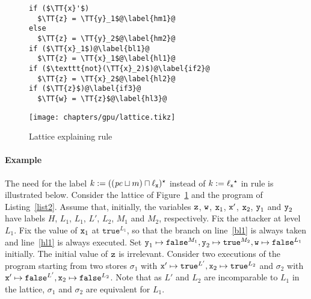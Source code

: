 \begin{figure}[ht]
\begin{minipage}{0.65\linewidth}
\centering
\begin{lstlisting}[caption=Example explaining rule \refrule{bs:cmd:ags},label=list2]
if ($\TT{x}'$)
  $\TT{z} = \TT{y}_1$@\label{hm1}@
else
  $\TT{z} = \TT{y}_2$@\label{hm2}@
if ($\TT{x}_1$)@\label{bl1}@
  $\TT{z} = \TT{x}_1$@\label{hl1}@
if ($\texttt{not}(\TT{x}_2)$)@\label{if2}@
  $\TT{z} = \TT{x}_2$@\label{hl2}@
if ($\TT{z}$)@\label{if3}@
  $\TT{w} = \TT{z}$@\label{hl3}@
\end{lstlisting}
\end{minipage}
\hspace{-1.5cm}
\begin{minipage}{0.45\linewidth}
\centering
{\texttt{[image: chapters/gpu/lattice.tikz]}}
\caption{Lattice explaining rule }
\label{fig:lattice}
\end{minipage}
\end{figure}

\paragraph{Example} 
The need for the label $k := ((\mathit{pc} \sqcup m) \sqcap \ell_{\texttt{x}}){}^\star$
instead of $k := \ell_{\texttt{x}}{}^\star$ in rule  is illustrated
below. Consider the lattice of Figure~\ref{fig:lattice} and the
program of Listing~\ref{list2}. Assume 
that, initially, the variables $\texttt{z}$, $\texttt{w}$, $\texttt{x}_1$,
$\texttt{x}'$, $\texttt{x}_2$, $\texttt{y}_1$ and $\texttt{y}_2$ have labels $H$,
$L_1$, $L_1$, $L'$, $L_2$, $M_1$ and $M_2$, 
respectively. Fix the attacker at level $L_1$. Fix the value of $\texttt{x}_1$
at $\texttt{true}^{L_1}$, so that the branch on line~\ref{bl1} is
always taken and line~\ref{hl1} is always executed. Set $\texttt{y}_1 \mapsto
\texttt{false}^{M_1}, \texttt{y}_2 \mapsto \texttt{true}^{M_2}, \texttt{w} \mapsto
\texttt{false}^{L_1}$ initially. The initial value of $\texttt{z}$ is
irrelevant. Consider two executions of the program starting from two
stores $\sigma_1$ with $\texttt{x}' \mapsto \texttt{true}^{L'}, \texttt{x}_2 \mapsto
\texttt{true}^{L_2}$ and $\sigma_2$ with $\texttt{x}' \mapsto
\texttt{false}^{L'}, \texttt{x}_2 \mapsto \texttt{false}^{L_2}$. Note that
as $L'$ and $L_2$ are incomparable to $L_1$ in the lattice,
$\sigma_1$ and $\sigma_2$ are equivalent for $L_1$. 

